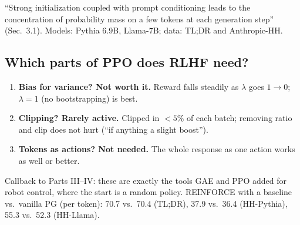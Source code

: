 {\small ``Strong initialization coupled with prompt conditioning leads to the concentration of probability mass on a few tokens at each generation step'' (Sec.~3.1). Models: Pythia 6.9B, Llama-7B; data: TL;DR and Anthropic-HH.}

\subsection{Which parts of PPO does RLHF need?}

\begin{minipage}[c]{0.44\linewidth}
\centering
{}
\end{minipage}\hfill
\begin{minipage}[c]{0.53\linewidth}
\begin{enumerate}
  \item \textbf{\color{AtlasWarm}Bias for variance? Not worth it.} Reward falls steadily as $\lambda$ goes $1\to0$; $\lambda=1$ (no bootstrapping) is best.
  \item \textbf{Clipping? Rarely active.} Clipped in $<5\%$ of each batch; removing ratio and clip does not hurt (``if anything a slight boost'').
  \item \textbf{Tokens as actions? Not needed.} The whole response as one action works as well or better.
\end{enumerate}
\end{minipage}

\begin{notebox}
Callback to Parts III--IV: these are exactly the tools GAE and PPO added for robot control, where the start is a random policy. REINFORCE with a baseline vs.\ vanilla PG (per token): 70.7 vs.\ 70.4 (TL;DR), 37.9 vs.\ 36.4 (HH-Pythia), 55.3 vs.\ 52.3 (HH-Llama).
\end{notebox}

